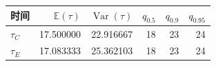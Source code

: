 \begin{tabular}{lrrrrr}
\toprule
时间 & $\mathbb E(\tau)$ & $\operatorname{Var}(\tau)$ & $q_{0.5}$ & $q_{0.9}$ & $q_{0.95}$ \\
\midrule
$\tau_C$ & 17.500000 & 22.916667 & 18 & 23 & 24 \\
$\tau_E$ & 17.083333 & 25.362103 & 18 & 23 & 24 \\
\bottomrule
\end{tabular}
